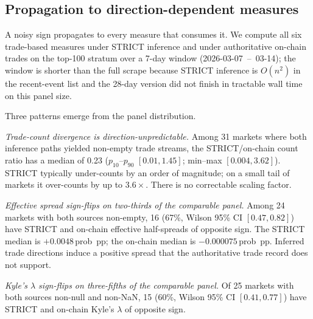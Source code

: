 \documentclass[11pt,a4paper,twocolumn]{article}
\begin{document}
\subsection{Propagation to direction-de\-pen\-dent measures}\label{ssec:strict-vs-onchain}

A noisy sign propagates to every measure that consumes it. We compute
all six trade-based measures under STRICT inference and under
authoritative on-chain trades on the top-100 stratum over a 7-day
window (2026-03-07~--~03-14); the window is shorter than the full
scrape because STRICT inference is $O(n^2)$ in the recent-event list
and the 28-day version did not finish in tractable wall time on this
panel size.

Three patterns emerge from the panel distribution.

\textit{Trade-count divergence is direction-un\-pre\-dict\-able.}
Among 31 markets where both inference paths yielded non-empty trade
streams, the STRICT/on-chain count ratio has a median of 0.23
($p_{10}$--$p_{90}$ $[0.01, 1.45]$; min--max $[0.004, 3.62]$).
STRICT typically under-counts by an order of magnitude; on a small
tail of markets it over-counts by up to $3.6\times$. There is no
correctable scaling factor.

\textit{Effective spread sign-flips on two-thirds of the comparable
panel.} Among 24 markets with both sources non-empty,
16 (67\%, Wilson 95\% CI $[0.47, 0.82]$) have STRICT and on-chain
effective half-spreads of opposite sign. The STRICT median is
$+0.0048$\,prob~pp; the on-chain median is $-0.000075$\,prob~pp.
Inferred trade directions induce a positive spread that the
authoritative trade record does not support.

\textit{Kyle's $\lambda$ sign-flips on three-fifths of the comparable
panel.} Of 25 markets with both sources non-null and non-NaN, 15
(60\%, Wilson 95\% CI $[0.41, 0.77]$) have STRICT and on-chain
Kyle's $\lambda$ of opposite sign.
\end{document}
